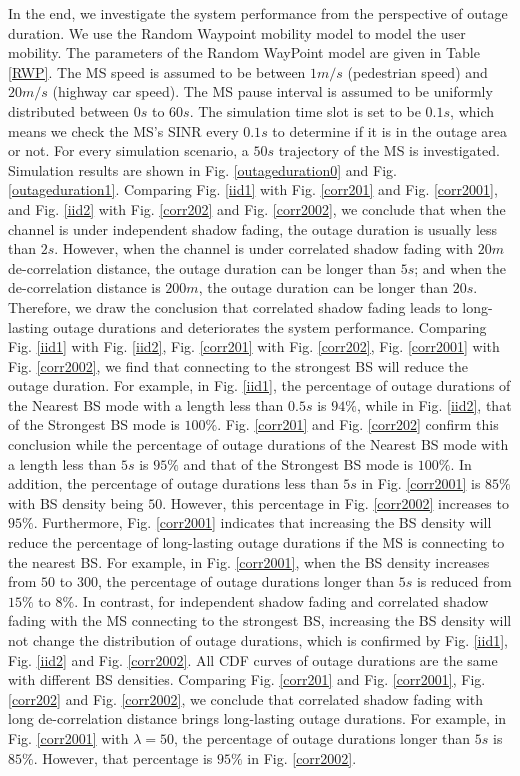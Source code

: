 \documentclass[journal,10pt]{IEEEtran}
\begin{document}
 \par In the end, we investigate the system performance from the perspective of outage duration. We use the Random Waypoint mobility model to model the user mobility. The parameters of the Random WayPoint model are given in Table \ref{RWP}. The MS speed is assumed to be between $1m/s$ (pedestrian speed) and $20m/s$ (highway car speed). The MS pause interval is assumed to be uniformly distributed between $0s$ to $60s$. The simulation time slot is set to be $0.1s$, which means we check the MS's SINR every $0.1s$ to determine if it is in the outage area or not. For every simulation scenario, a $50s$ trajectory of the MS is investigated. Simulation results are shown in Fig. \ref{outageduration0} and Fig. \ref{outageduration1}. Comparing Fig. \ref{iid1} with Fig. \ref{corr201} and Fig. \ref{corr2001}, and Fig. \ref{iid2} with Fig. \ref{corr202} and Fig. \ref{corr2002}, we conclude that when the channel is under independent shadow fading, the outage duration is usually less than $2s$. However,  when the channel is under correlated shadow fading with $20m$ de-correlation distance, the outage duration can be longer than $5s$; and when the de-correlation distance is $200m$, the outage duration can be longer than $20s$. Therefore, we draw the conclusion that correlated shadow fading leads to long-lasting outage durations and deteriorates the system performance. Comparing Fig. \ref{iid1} with Fig. \ref{iid2},  Fig. \ref{corr201} with Fig. \ref{corr202}, Fig. \ref{corr2001} with Fig. \ref{corr2002}, we find that connecting to the strongest BS will reduce the outage duration. For example, in Fig. \ref{iid1}, the percentage of outage durations of the Nearest BS mode with a length less than $0.5s$ is $94\%$, while in Fig. \ref{iid2}, that of the Strongest BS mode is $100\%$.  Fig. \ref{corr201} and Fig. \ref{corr202} confirm this conclusion while the percentage of outage durations of the Nearest BS mode with a length less than $5s$ is $95\%$ and that of the Strongest BS mode is $100\%$. In addition, the percentage of outage durations less than $5s$ in Fig. \ref{corr2001} is $85\%$ with BS density being $50$. However, this percentage in Fig. \ref{corr2002} increases to $95\%$. Furthermore, Fig. \ref{corr2001} indicates that increasing the BS density will reduce the percentage of long-lasting outage durations if the MS is connecting to the nearest BS. For example, in Fig. \ref{corr2001}, when the BS density increases from $50$ to $300$, the percentage of outage durations longer than $5s$ is reduced from $15\%$ to $8\%$. In contrast, for independent shadow fading and correlated shadow fading with the MS connecting to the strongest BS, increasing the BS density will not change the distribution of outage durations, which is confirmed by Fig. \ref{iid1}, Fig. \ref{iid2} and Fig. \ref{corr2002}. All CDF curves of outage durations are the same with different BS densities. Comparing Fig. \ref{corr201} and Fig. \ref{corr2001}, Fig. \ref{corr202} and Fig. \ref{corr2002}, we conclude that correlated shadow fading with long de-correlation distance brings long-lasting outage durations. For example, in Fig. \ref{corr2001} with $\lambda = 50$, the percentage of outage durations longer than $5s$ is $85\%$. However, that percentage is $95\%$ in Fig. \ref{corr2002}.
\end{document}
